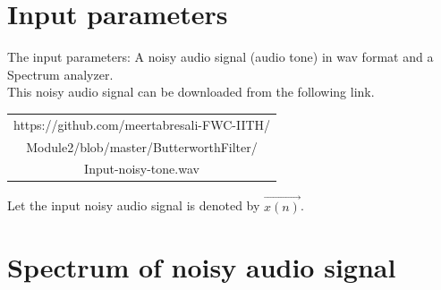 \documentclass[journal,10pt,twocolumn]{article}
\begin{document}
\section{Input parameters}
\vspace{0.2cm}
The input parameters: A noisy audio signal (audio tone) in wav format and a Spectrum analyzer. \\
This noisy audio signal can be downloaded from the following link.\\
\begin{table}[h]
\centering
\begin{tabular}{| c |} \hline
 \rule{0pt}{20pt} https://github.com/meertabresali-FWC-IITH/\\
 Module2/blob/master/ButterworthFilter/ \\
 Input-noisy-tone.wav \\\hline
\end{tabular}
\end{table}

Let the input noisy audio signal is denoted by $\vec{x(n)}$.

\section{Spectrum of noisy audio signal}
\end{document}
